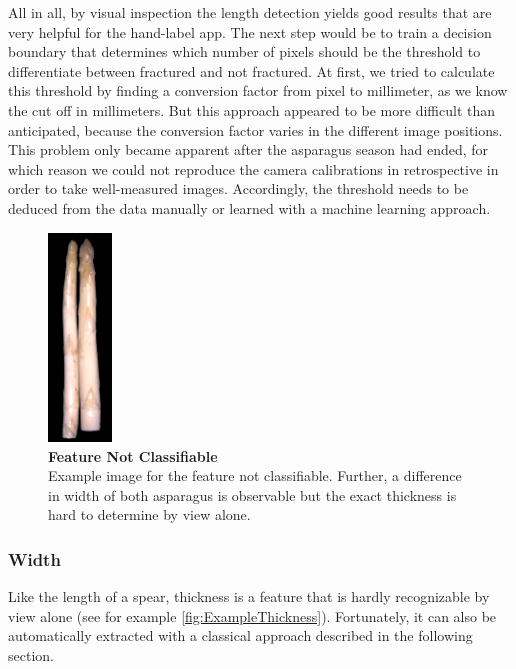 \bigskip
All in all, by visual inspection the length detection yields good results that are very helpful for the hand-label app. The next step would be to train a decision boundary that determines which number of pixels should be the threshold to differentiate between fractured and not fractured. At first, we tried to calculate this threshold by finding a conversion factor from pixel to millimeter, as we know the cut off in millimeters. But this approach appeared to be more difficult than anticipated, because the conversion factor varies in the different image positions. This problem only became apparent after the asparagus season had ended, for which reason we could not reproduce the camera calibrations in retrospective in order to take well-measured images. Accordingly, the threshold needs to be deduced from the data manually or learned with a machine learning approach.

\begin{figure}
  \centering
  \includegraphics[width=0.15\textwidth]{Figures/chapter03/example_img_thick.png}
  \caption[Example Image Not Classifiable]{ \textbf{Feature Not Classifiable} \\ Example image for the feature not classifiable. Further, a difference in width of both asparagus is observable but the exact thickness is hard to determine by view alone.}
  \label{fig:ExampleThickness}
  \vspace{-15pt}
\end{figure}

\subsubsection{Width}
\label{subsec:Width}

Like the length of a spear, thickness is a feature that is hardly recognizable by view alone (see for example \autoref{fig:ExampleThickness}). Fortunately, it can also be automatically extracted with a classical approach described in the following section.

